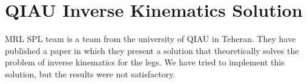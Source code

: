 \section{QIAU Inverse Kinematics Solution}
MRL SPL team is a team from the university of QIAU in Teheran. They have published a paper in which they present a solution that theoretically solves the problem of inverse kinematics for the legs. We have tried to implement this solution, but the results were not satisfactory.